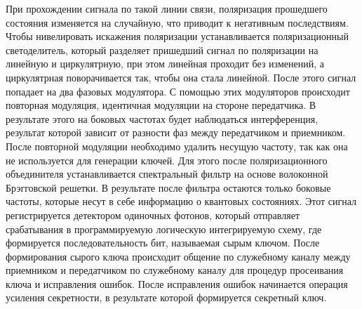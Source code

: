 При прохождении сигнала по такой линии связи, поляризация прошедшего состояния изменяется на случайную, что приводит к негативным последствиям. Чтобы нивелировать искажения поляризации устанавливается поляризационный светоделитель, который разделяет пришедший сигнал по поляризации на линейную и циркулятрную, при этом линейная проходит без изменений, а циркулятрная поворачивается так, чтобы она стала линейной. После этого сигнал попадает на два фазовых модулятора. С помощью этих модуляторов происходит повторная модуляция, идентичная модуляции на стороне передатчика. В результате этого на боковых частотах будет наблюдаться интерференция, результат которой зависит от разности фаз между передатчиком и приемником. После повторной модуляции необходимо удалить несущую частоту, так как она не используется для генерации ключей. Для этого после поляризационного объединителя устанавливается спектральный фильтр на основе волоконной Брэгговской решетки.
В результате после фильтра остаются только боковые частоты, которые несут в себе информацию о квантовых состояниях. Этот сигнал регистрируется детектором одиночных фотонов, который отправляет срабатывания в программируемую логическую интегрируемую схему, где формируется последовательность бит, называемая сырым ключом. После формирования сырого ключа происходит общение по служебному каналу между приемником и передатчиком по служебному каналу для процедур просеивания ключа и исправления ошибок. После исправления ошибок начинается операция усиления секретности, в результате которой формируется секретный ключ.

